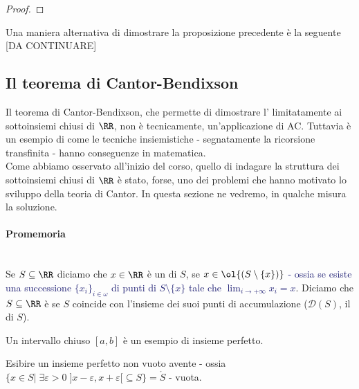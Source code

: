 \documentclass[11pt]{scrartcl}
\begin{document}
\begin{proof}
	
\end{proof}

\begin{exercise}
	Una maniera alternativa di dimostrare la proposizione precedente è la seguente [DA CONTINUARE]
\end{exercise}

\subsection{\texorpdfstring{\;Il teorema di Cantor-Bendixson}{Il teorema di Cantor-Bendixson}}
Il teorema di Cantor-Bendixson, che permette di dimostrare l' limitatamente ai sottoinsiemi chiusi di $\RR$, non è tecnicamente, un'applicazione di AC.
Tuttavia è un esempio di come le tecniche insiemistiche - segnatamente la ricorsione transfinita - hanno conseguenze in matematica.\\
Come abbiamo osservato all'inizio del corso, quello di indagare la struttura dei sottoinsiemi chiusi di $\RR$ è stato, forse, uno dei problemi che hanno motivato lo sviluppo della teoria di Cantor. In 
questa sezione ne vedremo, in qualche misura la soluzione.

\paragraph*{Promemoria}\mbox{}\\
Se $S \subseteq \RR$ diciamo che $x \in \RR$ è un  di $S$, se $x \in \ol{(S \setminus \{x\})}$ \textcolor{MidnightBlue}{- ossia se esiste una successione $\{x_i\}_{i \in \omega}$ di 
punti di $S \setminus \{x\}$ tale che $\lim_{i \to +\infty} x_i = x$}. Diciamo che $S \subseteq \RR$ è  se $S$ coincide con l'insieme dei suoi punti di accumulazione ($\mathcal{D}(S)$, il  di $S$).

\begin{example}
	Un intervallo chiuso $[a,b]$ è un esempio di insieme perfetto.
\end{example}

\begin{exercise}
	Esibire un insieme perfetto non vuoto avente  - ossia $\{x \in S | \; \exists \varepsilon > 0 \; ]x -\varepsilon,x+\varepsilon[ \subseteq S\} = \mathring{S}$ - vuota.
\end{exercise}
\end{document}
